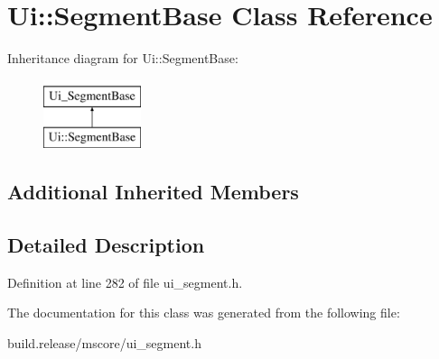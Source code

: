 \hypertarget{class_ui_1_1_segment_base}{}\section{Ui\+:\+:Segment\+Base Class Reference}
\label{class_ui_1_1_segment_base}
Inheritance diagram for Ui\+:\+:Segment\+Base\+:\begin{figure}[H]
\begin{center}
\leavevmode
\includegraphics[height=2.000000cm]{class_ui_1_1_segment_base}
\end{center}
\end{figure}
\subsection*{Additional Inherited Members}


\subsection{Detailed Description}


Definition at line 282 of file ui\+\_\+segment.\+h.



The documentation for this class was generated from the following file\+:\begin{DoxyCompactItemize}
\item 
build.\+release/mscore/ui\+\_\+segment.\+h\end{DoxyCompactItemize}
